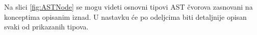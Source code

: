 Na slici \ref{fig:ASTNode} se mogu videti osnovni tipovi AST čvorova zasnovani na konceptima opisanim iznad. U nastavku će po odeljcima biti detaljnije opisan svaki od prikazanih tipova.





